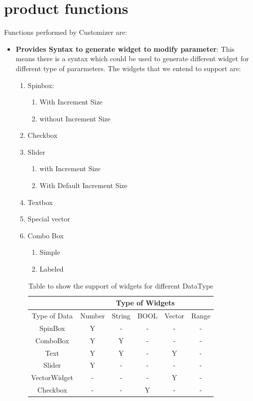 \section{product functions}

Functions performed by Customizer are:
\begin{itemize}
	\item {\bf Provides Syntax to generate widget to modify parameter}: This means there is a syntax which could be used to generate different widget for different type of pararmeters.
	The widgets that we entend to support are: 
	\begin{enumerate} 
		\item Spinbox:
		\begin{enumerate}
			\item With Increment Size
			\item without Increment Size 
		\end{enumerate} 
		\item Checkbox 
		\item Slider
		\begin{enumerate}
			\item with Increment Size
			\item With Default Increment Size
		\end{enumerate}
		\item Textbox
		\item Special vector 
		\item Combo Box
		\begin{enumerate}
			\item Simple
			\item Labeled 
		\end{enumerate}
		
		\begin{table}[h]
			\centering
			\begin{tabular}{ |c|c|c|c|c|c| }
				\hline
				& \multicolumn{5}{|c|}{Type of Widgets} \\
				\hline
				Type of Data&	Number&	String&	BOOL &Vector &Range	 \\ [0.5ex]
				\hline 
				SpinBox&Y&	-&	-&	-&	- \\ \hline
				ComboBox&	Y&	Y&	-&	-&	- \\ \hline
				Text&	Y&	Y&	-&	Y&	- \\ \hline
				Slider&	Y&	-&	-&	-&	- \\ \hline
				VectorWidget&	-&	-&	-&	Y&- \\ \hline
				Checkbox&	-&	-&	Y&	-&	- \\ [1ex]
				\hline
			\end{tabular}
			\caption{Table to show the support of widgets for different DataType}
			\label{table2}
		\end{table}
		

\end{enumerate}
\end{itemize}
